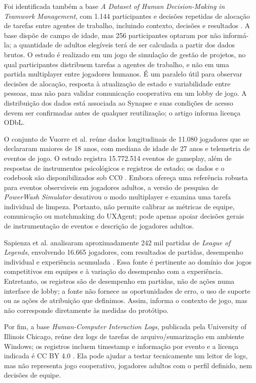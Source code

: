 \documentclass[conference]{IEEEtran}
\begin{document}
Foi identificada também a base \textit{A Dataset of Human Decision-Making in Teamwork Management}, com 1.144 participantes e decisões repetidas de alocação de tarefas entre agentes de trabalho, incluindo contexto, decisões e resultados \cite{teamwork_dataset}. A base dispõe de campo de idade, mas 256 participantes optaram por não informá-la; a quantidade de adultos elegíveis terá de ser calculada a partir dos dados brutos. O estudo é realizado em um jogo de simulação de gestão de projetos, no qual participantes distribuem tarefas a agentes de trabalho, e não em uma partida multiplayer entre jogadores humanos. É um paralelo útil para observar decisões de alocação, resposta à atualização de estado e variabilidade entre pessoas, mas não para validar comunicação cooperativa em um lobby de jogo. A distribuição dos dados está associada ao Synapse e suas condições de acesso devem ser confirmadas antes de qualquer reutilização; o artigo informa licença ODbL.

O conjunto de Vuorre et al. reúne dados longitudinais de 11.080 jogadores que se declararam maiores de 18 anos, com mediana de idade de 27 anos e telemetria de eventos de jogo. O estudo registra 15.772.514 eventos de gameplay, além de respostas de instrumentos psicológicos e registros de estado; os dados e o codebook são disponibilizados sob CC0 \cite{powerwash_dataset}. Embora ofereça uma referência robusta para eventos observáveis em jogadores adultos, a versão de pesquisa de \textit{PowerWash Simulator} desativou o modo multiplayer e examina uma tarefa individual de limpeza. Portanto, não permite calibrar as métricas de equipe, comunicação ou matchmaking do UXAgent; pode apenas apoiar decisões gerais de instrumentação de eventos e descrição de jogadores adultos.

Sapienza et al. analisaram aproximadamente 242 mil partidas de \textit{League of Legends}, envolvendo 16.665 jogadores, com resultados de partidas, desempenho individual e experiência acumulada \cite{lol_dataset}. Essa fonte é pertinente ao domínio dos jogos competitivos em equipes e à variação do desempenho com a experiência. Entretanto, os registros são de desempenho em partidas, não de ações numa interface de lobby; a fonte não fornece as oportunidades de erro, o uso de suporte ou as ações de atribuição que definimos. Assim, informa o contexto de jogo, mas não corresponde diretamente às medidas do protótipo.

Por fim, a base \textit{Human-Computer Interaction Logs}, publicada pela University of Illinois Chicago, reúne dez logs de tarefas de arquivo/sumarização em ambiente Windows; os registros incluem timestamp e informação por evento e a licença indicada é CC BY 4.0 \cite{uiclogs}. Ela pode ajudar a testar tecnicamente um leitor de logs, mas não representa jogo cooperativo, jogadores adultos com o perfil definido, nem decisões de equipe.
\end{document}
